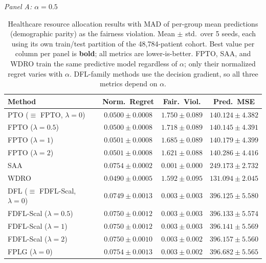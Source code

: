 \begin{table}[htbp]
\centering
\caption{Healthcare resource allocation results with MAD of per-group mean predictions (demographic parity) as the fairness violation. Mean $\pm$ std.\ over 5 seeds, each using its own train/test partition of the 48{,}784-patient cohort. Best value per column per panel is \textbf{bold}; all metrics are lower-is-better. FPTO, SAA, and WDRO train the same predictive model regardless of $\alpha$; only their normalized regret varies with $\alpha$. DFL-family methods use the decision gradient, so all three metrics depend on $\alpha$.}
\label{tab:healthcare-dp}
\footnotesize
\setlength{\tabcolsep}{5pt}

\smallskip
\textit{Panel A: $\alpha = 0.5$}

\smallskip
\begin{tabular}{l ccc}
\toprule
Method & Norm.\ Regret & Fair.\ Viol. & Pred.\ MSE \\
\midrule
PTO ($\equiv$ FPTO, $\lambda\!=\!0$)         & $0.0500 \pm 0.0008$ & $1.750 \pm 0.089$ & $140.124 \pm 4.382$ \\
FPTO ($\lambda\!=\!0.5$)                     & $0.0500 \pm 0.0008$ & $1.718 \pm 0.089$ & $140.145 \pm 4.391$ \\
FPTO ($\lambda\!=\!1$)                       & $0.0501 \pm 0.0008$ & $1.685 \pm 0.089$ & $140.179 \pm 4.399$ \\
FPTO ($\lambda\!=\!2$)                       & $0.0501 \pm 0.0008$ & $1.621 \pm 0.088$ & $140.286 \pm 4.416$ \\
\midrule
SAA                                          & $0.0754 \pm 0.0002$ & $\mathbf{0.001 \pm 0.000}$ & $249.173 \pm 2.732$ \\
WDRO                                         & $\mathbf{0.0490 \pm 0.0005}$ & $1.592 \pm 0.095$ & $\mathbf{131.094 \pm 2.045}$ \\
\midrule
DFL ($\equiv$ FDFL-Scal, $\lambda\!=\!0$)    & $0.0749 \pm 0.0013$ & $0.003 \pm 0.003$ & $396.125 \pm 5.580$ \\
FDFL-Scal ($\lambda\!=\!0.5$)                & $0.0750 \pm 0.0012$ & $0.003 \pm 0.003$ & $396.133 \pm 5.574$ \\
FDFL-Scal ($\lambda\!=\!1$)                  & $0.0750 \pm 0.0012$ & $0.003 \pm 0.003$ & $396.141 \pm 5.569$ \\
FDFL-Scal ($\lambda\!=\!2$)                  & $0.0750 \pm 0.0010$ & $0.003 \pm 0.002$ & $396.157 \pm 5.560$ \\
\midrule
FPLG ($\lambda\!=\!0$)                       & $0.0754 \pm 0.0013$ & $0.003 \pm 0.002$ & $396.682 \pm 5.565$ \\

\end{tabular}
\end{table}
